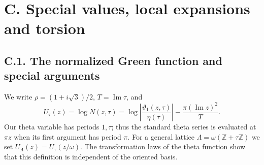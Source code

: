 \section{C. Special values, local expansions and torsion}
\subsection{C.1. The normalized Green function and special arguments}
We write $\rho=(1+i\sqrt3)/2$, $T=\operatorname{Im}\tau$, and
\[
 U_\tau(z)=\log N(z,\tau)
 =\log\left|\frac{\vartheta _1(z,\tau)}{\eta(\tau)}\right|
       -\frac{\pi(\operatorname{Im}z)^2}{T}.
\]
Our theta variable has periods $1,\tau$; thus the standard theta series
is evaluated at $\pi z$ when its first argument has period $\pi$.
For a general lattice $\Lambda=\omega(\mathbb Z+\tau\mathbb Z)$ we set
$U_\Lambda(z)=U_\tau(z/\omega)$. The transformation laws of the theta
function show that this definition is independent of the oriented basis.

